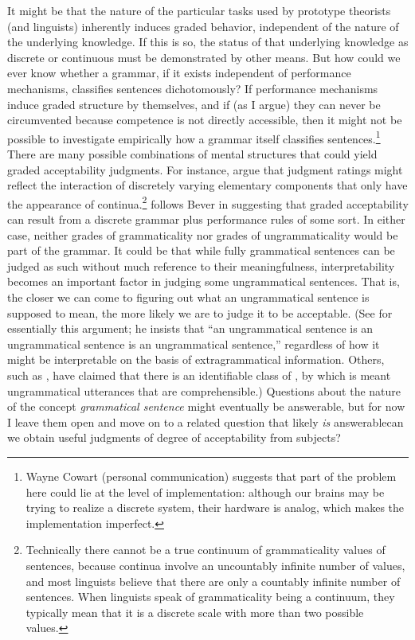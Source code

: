 It might be that the nature of the particular tasks used by prototype theorists (and linguists) inherently induces graded behavior, independent of the nature of the underlying knowledge. If this is so, the status of that underlying knowledge as discrete or continuous must be demonstrated by other means. But how could we ever know whether a grammar, if it exists independent of performance mechanisms, classifies sentences dichotomously? If performance mechanisms induce graded structure by themselves, and if (as I argue) they can never be circumvented because competence is not directly accessible, then it might not be possible to investigate empirically how a grammar itself classifies sentences.\footnote{Wayne Cowart (personal communication) suggests that part of the problem here could lie at the level of implementation: although our brains may be trying to realize a discrete system, their hardware is analog, which makes the implementation imperfect.
}
 There are many possible combinations of mental structures that could yield graded acceptability judgments. For instance,  \citet{FillmoreEtAl1979b} 
 argue that judgment ratings might reflect the interaction of discretely varying elementary components that only have the appearance of continua.\footnote{Technically there cannot be a true continuum of grammaticality values of sentences, because continua involve an uncountably infinite number of values, and most linguists believe that there are only a countably infinite number of sentences. When linguists speak of grammaticality being a continuum, they typically mean that it is a discrete scale with more than two possible values.}
 \citet{Carroll1979} follows Bever in suggesting that graded acceptability can result from a discrete 
grammar plus performance rules of some sort. In either case, neither grades of grammaticality nor grades of ungrammaticality would be part of the grammar. It could be that while fully grammatical sentences can be judged as such without much reference to their meaningfulness, interpretability becomes an important factor in judging some ungrammatical sentences. That is, the closer we can come to figuring out what an ungrammatical sentence is supposed to mean, the more likely we are to judge it to be acceptable. (See \citet{Fowler1970} for essentially this argument; he insists that ``an ungrammatical sentence is an ungrammatical sentence is an ungrammatical sentence,'' regardless of how it might be interpretable on the basis of extragrammatical information. Others, such as \citet{Katz1964}, have claimed that there is an identifiable class of , by which is meant ungrammatical utterances that are comprehensible.) Questions about the nature of the concept \textit{grammatical sentence} might eventually be answerable, but for now I leave them open and move on to a related question that likely \textit{is} answerable\schdash{}can we obtain useful judgments of degree of acceptability from subjects?

